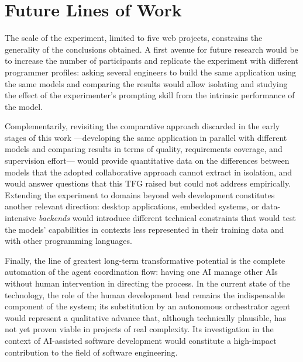 \section{Future Lines of Work} \label{sec:future-work}

The scale of the experiment, limited to five web projects, constrains the generality of the conclusions obtained. A first avenue for future research would be to increase the number of participants and replicate the experiment with different programmer profiles: asking several engineers to build the same application using the same models and comparing the results would allow isolating and studying the effect of the experimenter's prompting skill from the intrinsic performance of the model.

Complementarily, revisiting the comparative approach discarded in the early stages of this work ---developing the same application in parallel with different models and comparing results in terms of quality, requirements coverage, and supervision effort--- would provide quantitative data on the differences between models that the adopted collaborative approach cannot extract in isolation, and would answer questions that this \ac{TFG} raised but could not address empirically. Extending the experiment to domains beyond web development constitutes another relevant direction: desktop applications, embedded systems, or data-intensive \textit{backends} would introduce different technical constraints that would test the models' capabilities in contexts less represented in their training data and with other programming languages.

Finally, the line of greatest long-term transformative potential is the complete automation of the agent coordination flow: having one \ac{AI} manage other \ac{AI}s without human intervention in directing the process. In the current state of the technology, the role of the human development lead remains the indispensable component of the system; its substitution by an autonomous orchestrator agent would represent a qualitative advance that, although technically plausible, has not yet proven viable in projects of real complexity. Its investigation in the context of \ac{AI}-assisted software development would constitute a high-impact contribution to the field of software engineering.